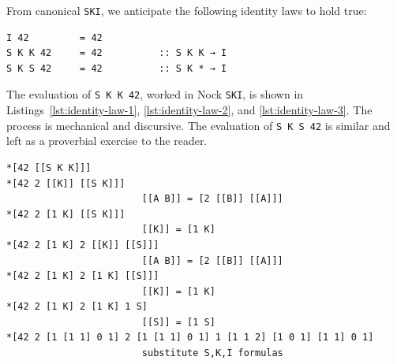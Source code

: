 \documentclass[twoside]{article}
\begin{document}
From canonical \texttt{SKI}, we anticipate the following identity laws to hold true:

\begin{lstlisting}[style=listingblock]
I 42         = 42
S K K 42     = 42          :: S K K → I
S K S 42     = 42          :: S K * → I
\end{lstlisting}

\noindent
The evaluation of \lstinline[style=inlinecode]{S K K 42}, worked in Nock \texttt{SKI}, is shown in Listings~\ref{lst:identity-law-1}, \ref{lst:identity-law-2}, and \ref{lst:identity-law-3}.  The process is mechanical and discursive.  The evaluation of \lstinline[style=inlinecode]{S K S 42} is similar and left as a proverbial exercise to the reader.

\begin{lstlisting}[style=listingblock,label=lst:identity-law-1,caption={Compilation expansion of \texttt{S K K 42}.}]
*[42 [[S K K]]]
*[42 2 [[K]] [[S K]]]
                        [[A B]] = [2 [[B]] [[A]]]
*[42 2 [1 K] [[S K]]]
                        [[K]] = [1 K]
*[42 2 [1 K] 2 [[K]] [[S]]]
                        [[A B]] = [2 [[B]] [[A]]]
*[42 2 [1 K] 2 [1 K] [[S]]]
                        [[K]] = [1 K]
*[42 2 [1 K] 2 [1 K] 1 S]
                        [[S]] = [1 S]
*[42 2 [1 [1 1] 0 1] 2 [1 [1 1] 0 1] 1 [1 1 2] [1 0 1] [1 1] 0 1]
                        substitute S,K,I formulas
\end{lstlisting}
\end{document}
